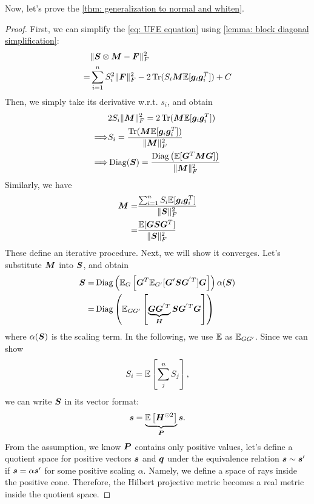 Now, let's prove the \cref{thm: generalization to normal and whiten}.
\begin{proof}
    First, we can simplify the \cref{eq: UFE equation} using \cref{lemma: block diagonal simplification}:
    \begin{align*}
        &\Vert{\bm{S}}\otimes{\bm{M}} - {\bm{F}}\Vert_F^2\\
        =& \sum_{i=1}^n S_i^2\Vert{\bm{F}}\Vert_F^2 - 2\operatorname{Tr}(S_i{\bm{M}}\mathbb{E}[{\bm{g}}_i{\bm{g}}_i^T]) +C
    \end{align*}
    Then, we simply take its derivative w.r.t. $s_i$, and obtain
    \begin{align*}
        &2S_i\Vert{\bm{M}}\Vert_F^2 = 2\operatorname{Tr}({\bm{M}}\mathbb{E}[{\bm{g}}_i{\bm{g}}_i^T])\\
        \Longrightarrow& S_i = \frac{\operatorname{Tr}({\bm{M}}\mathbb{E}[{\bm{g}}_i{\bm{g}}_i^T])}{\Vert{\bm{M}}\Vert_F^2}\\
        \Longrightarrow& \operatorname{Diag}({\bm{S}}) = \frac{\operatorname{Diag}\left(\mathbb{E}[{\bm{G}}^T{\bm{M}}{\bm{G}}]\right)}{\Vert{\bm{M}}\Vert_F^2}
    \end{align*}
    Similarly, we have
    \begin{align*}
        {\bm{M}} =& \frac{\sum_{i=1}^nS_i\mathbb{E}[{\bm{g}}_i{\bm{g}}_i^T]}{\Vert{\bm{S}}\Vert_F^2}\\
        =& \frac{\mathbb{E}[{\bm{G}}{\bm{S}}{\bm{G}}^T]}{\Vert{\bm{S}}\Vert_F^2}
    \end{align*}
These define an iterative procedure. Next, we will show it converges.
Let's substitute ${\bm{M}}$ into ${\bm{S}}$, and obtain
\begin{align*}
    {\bm{S}} =& \operatorname{Diag}\left(\mathbb{E}_{G}\left[{\bm{G}}^T\mathbb{E}_{G'}[{\bm{G}}'{\bm{S}}{\bm{G}}^{'T}]{\bm{G}}\right]\right)\alpha({\bm{S}})\\
    =& \operatorname{Diag}\left(\mathbb{E}_{GG'}\left[\underbrace{{\bm{G}}{\bm{G}}^{'T}}_{{\bm{H}}}{\bm{S}}{\bm{G}}^{'T}{\bm{G}}\right]\right)
\end{align*}
where $\alpha({\bm{S}})$ is the scaling term. In the following, we use $\mathbb{E}$ as $\mathbb{E}_{GG'}$.
Since we can show
\begin{align*}
    S_i = \mathbb{E}\left[\sum_{j}^nS_j\right],
\end{align*}
we can write ${\bm{S}}$ in its vector format:
\begin{align*}
    {\bm{s}} = \underbrace{\mathbb{E}\left[{\bm{H}}^{\odot 2}\right]}_{{\bm{P}}}{\bm{s}}.
\end{align*}
From the assumption, we know ${\bm{P}}$ contains only positive values, let's define a quotient space for positive vectors ${\bm{s}}$ and ${\bm{q}}$ under the equivalence relation ${\bm{s}}\sim {\bm{s}}'$ if ${\bm{s}} =\alpha {\bm{s}}'$ for some positive scaling $\alpha$. Namely, we define a space of rays inside the positive cone. Therefore, the Hilbert projective metric becomes a real metric inside the quotient space. 


\end{proof}
